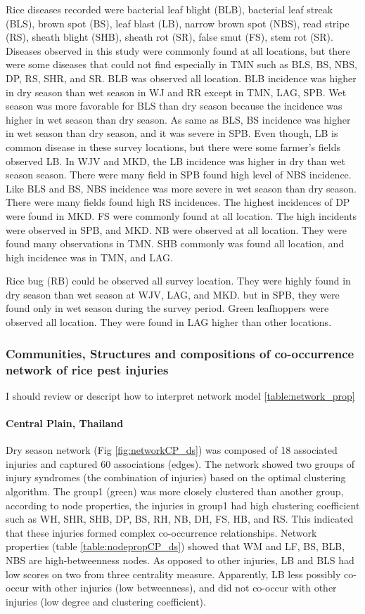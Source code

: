 Rice diseases recorded were bacterial leaf blight (BLB), bacterial leaf streak (BLS), brown spot (BS), leaf blast (LB), narrow brown spot (NBS), read stripe (RS), sheath blight (SHB), sheath rot (SR), false smut (FS), stem rot (SR). Diseases observed in this study were commonly found at all locations, but there were some diseases that could not find especially in TMN such as BLS, BS, NBS, DP, RS, SHR, and SR. BLB was observed all location. BLB incidence was higher in dry season than wet season in WJ and RR except in TMN, LAG, SPB. Wet season was more favorable for BLS than dry season because the incidence was higher in wet season than dry season. As same as BLS, BS incidence was higher in wet season than dry season, and it was severe in SPB. Even though, LB is common disease in these survey locations, but there were some farmer’s fields observed LB. In WJV and MKD, the LB incidence was higher in dry than wet season season. There were many field in SPB found high level of NBS incidence. Like BLS and BS, NBS incidence was more severe in wet season than dry season. There were many fields found high RS incidences. The highest incidences of DP were found in MKD. FS were commonly found at all location. The high incidents were observed in SPB, and MKD. NB were observed at all location. They were found many observations in TMN.  SHB commonly was found all location, and high incidence was in TMN, and LAG. 

Rice bug (RB) could be observed all survey location. They were highly found in dry season than wet season at WJV, LAG, and MKD. but in SPB, they were found only in wet season during the survey period.  Green leafhoppers were observed all location. They were found in LAG higher than other locations.

\subsubsection{Communities, Structures and compositions of co-occurrence network of rice pest injuries}
I should review or descript how to interpret network model 
\ref{table:network_prop}
\paragraph{Central Plain, Thailand}

Dry season network (Fig \ref{fig:networkCP_ds}) was composed of 18 associated injuries and captured 60 associations (edges). The network showed two groups of injury syndromes (the combination of injuries) based on the optimal clustering algorithm. The group1 (green) was more closely clustered than another group, according to node properties, the injuries in group1 had high clustering coefficient such as WH, SHR, SHB, DP, BS, RH, NB, DH, FS, HB, and RS. This indicated that these injuries formed complex co-occurrence relationships. Network properties (table \ref{table:nodepropCP_ds}) showed that WM and LF, BS, BLB, NBS are high-betweenness nodes.  As opposed to other injuries, LB and BLS had low scores on two from three centrality measure. Apparently, LB less possibly co-occur with other injuries (low betweenness), and did not co-occur with other injuries (low degree and clustering coefficient).

